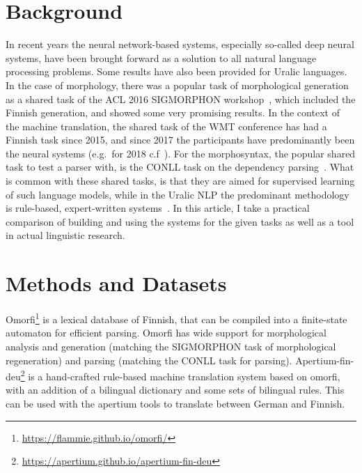 \documentclass[a4paper,notitlepage]{article}
\begin{document}
\section{Background}
\label{sec:background}

In recent years the neural network-based systems, especially so-called deep
neural systems, have been brought forward as a solution to all natural language
processing problems. Some results have also been provided for Uralic languages.
In the case of morphology, there was a popular task of morphological generation
as a shared task of the ACL 2016 SIGMORPHON
workshop~\citep{cotterell2016sigmorphon}, which included the Finnish generation,
and showed some very promising results. In the context of the machine
translation, the shared task of the WMT conference has had a Finnish task since
2015, and since 2017 the participants have predominantly been the neural systems
(e.g.\ for 2018 c.f~\citet{wmt2018findings}).  For the morphosyntax, the popular
shared task to test a parser with, is the CONLL task on the dependency
parsing~\citep{zeman2018conll}.  What is common with these shared tasks, is that
they are aimed for supervised learning of such language models, while in the
Uralic NLP the predominant methodology is rule-based, expert-written
systems~\citep{moshagen2014open}. In this article, I take a practical comparison
of building and using the systems for the given tasks as well as a tool in
actual linguistic research.

\section{Methods and Datasets}
\label{sec:methods}

Omorfi\footnote{\url{https://flammie.github.io/omorfi/}} is a lexical database
of Finnish, that can be compiled into a finite-state automaton for efficient
parsing.  Omorfi has wide support for morphological analysis and generation
(matching the SIGMORPHON task of morphological regeneration) and parsing
(matching the CONLL task for parsing).
Apertium-fin-deu\footnote{\url{https://apertium.github.io/apertium-fin-deu}} is
a hand-crafted rule-based machine translation system based on omorfi, with an
addition of a bilingual dictionary and some sets of bilingual rules. This can be
used with the apertium tools to translate between German and Finnish.
\end{document}
